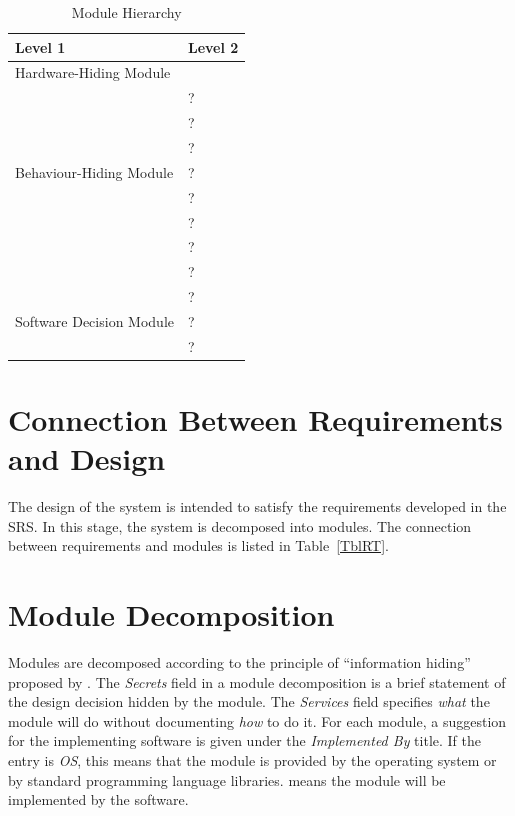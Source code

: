 \documentclass[12pt, titlepage]{article}
\begin{document}
\begin{table}[h!]
\centering
\begin{tabular}{p{} p{}}
\toprule
\textbf{Level 1} & \textbf{Level 2}\\
\midrule

{Hardware-Hiding Module} & ~ \\
\midrule

\multirow{7}{0.3\textwidth}{Behaviour-Hiding Module} & ?\\
& ?\\
& ?\\
& ?\\
& ?\\
& ?\\
& ?\\ 
& ?\\
\midrule

\multirow{3}{0.3\textwidth}{Software Decision Module} & {?}\\
& ?\\
& ?\\
\bottomrule

\end{tabular}
\caption{Module Hierarchy}
\label{TblMH}
\end{table}

\section{Connection Between Requirements and Design} \label{SecConnection}

The design of the system is intended to satisfy the requirements developed in
the SRS. In this stage, the system is decomposed into modules. The connection
between requirements and modules is listed in Table~\ref{TblRT}.


\section{Module Decomposition} \label{SecMD}

Modules are decomposed according to the principle of ``information hiding''
proposed by \citet{ParnasEtAl1984}. The \emph{Secrets} field in a module
decomposition is a brief statement of the design decision hidden by the
module. The \emph{Services} field specifies \emph{what} the module will do
without documenting \emph{how} to do it. For each module, a suggestion for the
implementing software is given under the \emph{Implemented By} title. If the
entry is \emph{OS}, this means that the module is provided by the operating
system or by standard programming language libraries.  \emph{\progname{}} means the
module will be implemented by the \progname{} software.
\end{document}

